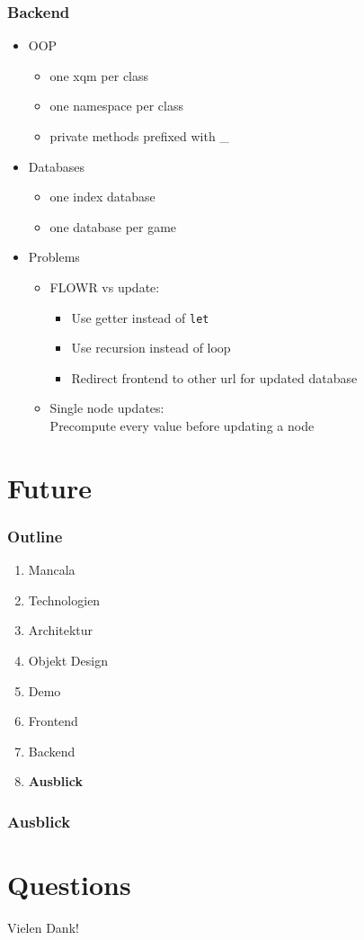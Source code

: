 \documentclass[
	10pt,
	t		%
]{beamer}
\begin{document}
\begin{frame}
\frametitle{Backend}
\begin{itemize}
\item OOP
\begin{itemize}
\item one xqm per class
\item one namespace per class
\item private methods prefixed with \_
\end{itemize}
\item Databases
\begin{itemize}
\item one index database
\item one database per game
\end{itemize}
\item Problems
\begin{itemize}
\item FLOWR vs update: 
\begin{itemize}
\item Use getter instead of \texttt{let}
\item Use recursion instead of loop
\item Redirect frontend to other url for updated database
\end{itemize}
\item Single node updates:\\
\quad Precompute every value before updating a node
\end{itemize}
\end{itemize}

\end{frame}

\section{Future}
\begin{frame}
\frametitle{Outline}
\begin{enumerate}
\item Mancala
\item Technologien
\item Architektur
\item Objekt Design
\item Demo
\item Frontend
\item Backend
\item \textbf{Ausblick}
\end{enumerate}
\end{frame}

\begin{frame}
\frametitle{Ausblick}

\end{frame}

\section{Questions}
\begin{frame}[plain, c]
\begin{center}
\Large Vielen Dank!
\end{center}
\end{frame}
\end{document}
